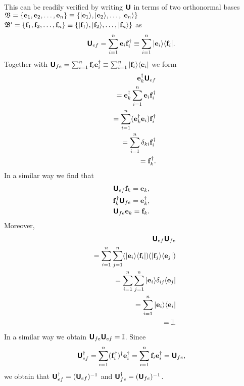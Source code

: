 This can be readily verified \cite{Schwinger.60} by writing $\textsf{\textbf{U}}$
in terms of two orthonormal bases
${\frak B}=\{{\bf e}_1,  {\bf e}_2, \ldots , {\bf e}_n\}\equiv \{\vert {\bf e}_1\rangle , \vert  {\bf e}_2\rangle , \ldots , \vert {\bf e}_n\rangle \}$
${\frak B}'=\{{\bf f}_1,  {\bf f}_2, \ldots , {\bf f}_n\}\equiv \{\vert {\bf f}_1\rangle , \vert  {\bf f}_2\rangle , \ldots , \vert {\bf f}_n\rangle \}$ as
\begin{equation}
\textsf{\textbf{U}}_{ef}= \sum_{i=1}^n  {\bf e}_i {\bf f}_i^\dagger
\equiv \sum_{i=1}^n  \vert {\bf e}_i\rangle \langle {\bf f}_i \vert
.
\end{equation}
Together with $\textsf{\textbf{U}}_{fe}= \sum_{i=1}^n  {\bf f}_i {\bf e}_i^\dagger \equiv  \sum_{i=1}^n  \vert {\bf f}_i\rangle \langle {\bf e}_i \vert $
we form
\begin{equation}
\begin{split}
{\bf e}_k^\dagger \textsf{\textbf{U}}_{ef}\\
\quad = {\bf e}_k^\dagger\sum_{i=1}^n  {\bf e}_i {\bf f}_i^\dagger \\
\quad
= \sum_{i=1}^n  ({\bf e}_k^\dagger {\bf e}_i) {\bf f}_i^\dagger \\
\quad
= \sum_{i=1}^n  \delta_{ki} {\bf f}_i^\dagger \\
\quad  = {\bf f}_k^\dagger
.
\end{split}
\end{equation}
In a similar way we find that
\begin{equation}
\begin{split}
\textsf{\textbf{U}}_{ef} {\bf f}_k = {\bf e}_k,\\
{\bf f}_k^\dagger \textsf{\textbf{U}}_{fe}   = {\bf e}_k^\dagger ,\\
\textsf{\textbf{U}}_{fe} {\bf e}_k  = {\bf f}_k .
\end{split}
\end{equation}
Moreover,
\begin{equation}
\begin{split}
\textsf{\textbf{U}}_{ef}\textsf{\textbf{U}}_{fe}\\
\quad
=
 \sum_{i=1}^n  \sum_{j=1}^n
(\vert {\bf e}_i\rangle \langle {\bf f}_i \vert )
(\vert {\bf f}_j\rangle \langle {\bf e}_j \vert )\\
\quad
=
 \sum_{i=1}^n  \sum_{j=1}^n
\vert {\bf e}_i\rangle \delta_{ij} \langle {\bf e}_j \vert \\
\quad
=
 \sum_{i=1}^n
\vert {\bf e}_i\rangle   \langle {\bf e}_i \vert \\
\quad
=
{\Bbb I}
.
\end{split}
\end{equation}
In a similar way we obtain
$\textsf{\textbf{U}}_{fe}\textsf{\textbf{U}}_{ef}=
{\Bbb I}$.
Since
\begin{equation}
\textsf{\textbf{U}}_{ef}^\dagger = \sum_{i=1}^n  ( {\bf f}_i^\dagger )^\dagger {\bf e}_i^\dagger
= \sum_{i=1}^n  {\bf f}_i {\bf e}_i^\dagger
= \textsf{\textbf{U}}_{fe},
\end{equation}
we obtain that $\textsf{\textbf{U}}_{ef}^\dagger = (\textsf{\textbf{U}}_{ef})^{-1}$
and $\textsf{\textbf{U}}_{fe}^\dagger = (\textsf{\textbf{U}}_{fe})^{-1}$.

